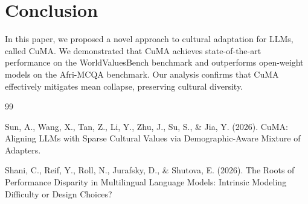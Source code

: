 \documentclass{article}
\begin{document}
\section{Conclusion}
In this paper, we proposed a novel approach to cultural adaptation for LLMs, called CuMA. We demonstrated that CuMA achieves state-of-the-art performance on the WorldValuesBench benchmark and outperforms open-weight models on the Afri-MCQA benchmark. Our analysis confirms that CuMA effectively mitigates mean collapse, preserving cultural diversity.

\begin{thebibliography}{99}

 Sun, A., Wang, X., Tan, Z., Li, Y., Zhu, J., Su, S., \& Jia, Y. (2026). CuMA: Aligning LLMs with Sparse Cultural Values via Demographic-Aware Mixture of Adapters.

 Shani, C., Reif, Y., Roll, N., Jurafsky, D., \& Shutova, E. (2026). The Roots of Performance Disparity in Multilingual Language Models: Intrinsic Modeling Difficulty or Design Choices?

\end{thebibliography}
\end{document}
